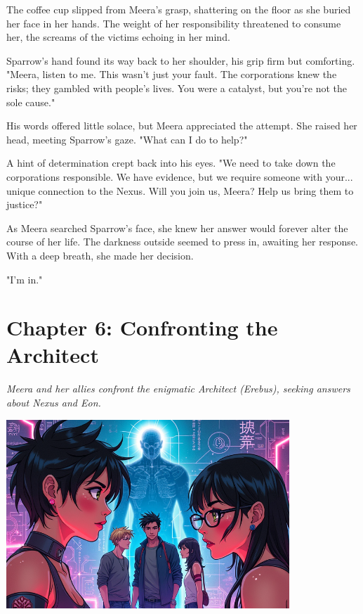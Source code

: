\documentclass[12pt]{report}  %
\begin{document}
The coffee cup slipped from Meera's grasp, shattering on the floor as
she buried her face in her hands. The weight of her responsibility
threatened to consume her, the screams of the victims echoing in her
mind.

Sparrow's hand found its way back to her shoulder, his grip firm but
comforting. "Meera, listen to me. This wasn't just your fault. The
corporations knew the risks; they gambled with people's lives. You were
a catalyst, but you're not the sole cause."

His words offered little solace, but Meera appreciated the attempt. She
raised her head, meeting Sparrow's gaze. "What can I do to help?"

A hint of determination crept back into his eyes. "We need to take down
the corporations responsible. We have evidence, but we require someone
with your... unique connection to the Nexus. Will you join us, Meera?
Help us bring them to justice?"

As Meera searched Sparrow's face, she knew her answer would forever
alter the course of her life. The darkness outside seemed to press in,
awaiting her response. With a deep breath, she made her decision.

"I'm in."


\chapter*{Chapter 6: Confronting the Architect}
\textit{Meera and her allies confront the enigmatic Architect (Erebus), seeking answers about Nexus and Eon.}

\begin{center}
\includegraphics[width=0.8\textwidth]{stories/my_story/step_6/scenes/architect_encounter.live.png}
\end{center}
\end{document}
